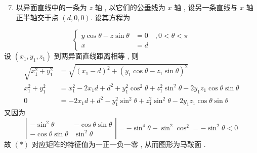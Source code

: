 \documentclass[10pt]{article}
\begin{document}
\begin{enumerate}
  \setcounter{enumi}{6}
  \item  以异面直线中的一条为  $z$  轴 ,  以它们的公垂线为  $x$  轴 ,  设另一条直线与  $x$  轴正半轴交于点  $(d, 0,0)$.  设其方程为 
\end{enumerate}
$$
\left\{\begin{aligned}
y \cos \theta-z \sin \theta &=0 \quad, 0<\theta<\pi \\
x &=d
\end{aligned}\right.
$$
 设  $\left(x_{1}, y_{1}, z_{1}\right)$  到两异面直线距离相等 ,  则 
$$
\begin{aligned}
\sqrt{x_{1}^{2}+y_{1}^{2}} &=\sqrt{\left(x_{1}-d\right)^{2}+\left(y_{1} \cos \theta-z_{1} \sin \theta\right)^{2}} \\
x_{1}^{2}+y_{1}^{2} &=x_{1}^{2}-2 x_{1} d+d^{2}+y_{1}^{2} \cos ^{2} \theta+z_{1}^{2} \sin ^{2} \theta-2 y_{1} z_{1} \cos \theta \sin \theta \\
0 &=-2 x_{1} d+d^{2}-y_{1}^{2} \sin ^{2} \theta+z_{1}^{2} \sin ^{2} \theta-2 y_{1} z_{1} \cos \theta \sin \theta
\end{aligned}
$$
 又因为 
$$
\left|\begin{array}{cc}
-\sin ^{2} \theta & -\cos \theta \sin \theta \\
-\cos \theta \sin \theta & \sin ^{2} \theta
\end{array}\right|=-\sin ^{4} \theta-\sin ^{2} \cos ^{2}=-\sin ^{2} \theta<0
$$
 故  $(*)$  对应矩阵的特征值为一正一负一零 ,  从而图形为马鞍面 .
\end{document}

